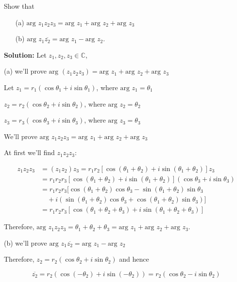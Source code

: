 \documentclass[
	12pt, %
	fleqn, %
	a4paper, %
]{LegrandOrangeBook}
\begin{document}
    \begin{exercise}
        Show that\begin{enumerate}
            \item[(a)] $\text{arg } z_1z_2z_3 = \text{arg } z_1 + \text{arg } z_2 + \text{arg } z_3$
            \item[(b)] $\text{arg } z_1 \overline{z_2} = \text{arg } z_1 - \text{arg } z_2$.
        \end{enumerate}
    \end{exercise}              
    \textbf{Solution:}
    Let $z_1, z_2, z_3 \in \mathbb{C}$,

(a) we'll prove $\text{arg }(z_1z_2z_3) = \text{arg } z_1 + \text{arg } z_2 + \text{arg } z_3$

Let $z_1 = r_1(\cos \theta_1 + i \sin \theta_1)$, where $\text{arg } z_1 = \theta_1$

$z_2 = r_2(\cos \theta_2 + i \sin \theta_2)$, where $\text{arg } z_2 = \theta_2$

$z_3 = r_3(\cos \theta_3 + i \sin \theta_3)$, where $\text{arg } z_3 = \theta_3$

We'll prove $\text{arg } z_1z_2z_3 = \text{arg } z_1 + \text{arg } z_2 + \text{arg } z_3$

At first we'll find $z_1z_2z_3$:

\begin{align*}
    z_1z_2z_3 &= (z_1z_2)z_3 = r_1r_2[\cos(\theta_1 + \theta_2) + i \sin(\theta_1 + \theta_2)]z_3 \\
    &= r_1r_2r_3[\cos(\theta_1 + \theta_2) + i \sin(\theta_1 + \theta_2)](\cos \theta_3 + i \sin \theta_3) \\
    &= r_1r_2r_3[\cos(\theta_1 + \theta_2) \cos \theta_3 - \sin(\theta_1 + \theta_2) \sin \theta_3 \\
    &\quad + i(\sin(\theta_1 + \theta_2) \cos \theta_3 + \cos(\theta_1 + \theta_2) \sin \theta_3)] \\
    &= r_1r_2r_3[\cos(\theta_1 + \theta_2 + \theta_3) + i \sin(\theta_1 + \theta_2 + \theta_3)]
\end{align*}

Therefore, $\text{arg } z_1z_2z_3 = \theta_1 + \theta_2 + \theta_3 = \text{arg } z_1 + \text{arg } z_2 + \text{arg } z_3$.

(b) we'll prove $\text{arg } z_1 \overline{z_2} = \text{arg } z_1 - \text{arg } z_2$

Therefore, $z_2 = r_2(\cos \theta_2 + i \sin \theta_2)$ and hence

\[
\overline{z_2} = r_2(\cos(-\theta_2) + i \sin(-\theta_2)) = r_2(\cos \theta_2 - i \sin \theta_2)
\]
\end{document}
